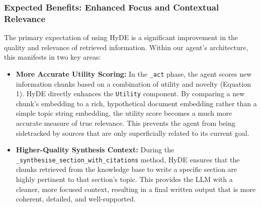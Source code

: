 \documentclass[12pt, a4paper]{article}
\begin{document}
\subsubsection{Expected Benefits: Enhanced Focus and Contextual Relevance}
The primary expectation of using HyDE is a significant improvement in the quality and relevance of retrieved information. Within our agent's architecture, this manifests in two key areas:
\begin{itemize}
    \item \textbf{More Accurate Utility Scoring:} In the \texttt{\_act} phase, the agent scores new information chunks based on a combination of utility and novelty (Equation 1). HyDE directly enhances the \texttt{Utility} component. By comparing a new chunk's embedding to a rich, hypothetical document embedding rather than a simple topic string embedding, the utility score becomes a much more accurate measure of true relevance. This prevents the agent from being sidetracked by sources that are only superficially related to its current goal.
    \item \textbf{Higher-Quality Synthesis Context:} During the \texttt{\_synthesise\_section\_with\_citations} method, HyDE ensures that the chunks retrieved from the knowledge base to write a specific section are highly pertinent to that section's topic. This provides the LLM with a cleaner, more focused context, resulting in a final written output that is more coherent, detailed, and well-supported.
\end{itemize}
\end{document}
